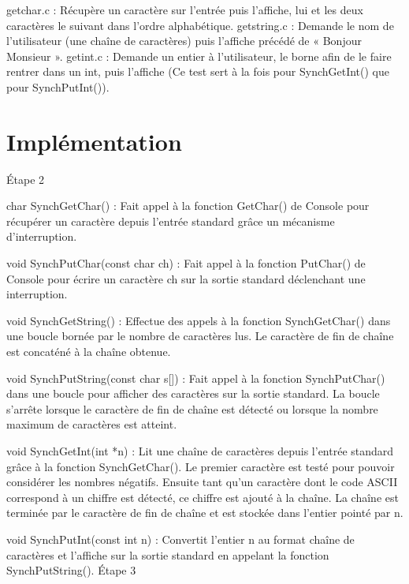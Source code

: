 \documentclass[12pt]{report}
\begin{document}
getchar.c : Récupère un caractère sur l’entrée puis l’affiche, lui et les deux caractères le suivant dans l’ordre alphabétique.
getstring.c : Demande le nom de l’utilisateur (une chaîne de caractères) puis l’affiche précédé de « Bonjour Monsieur ».
 getint.c : Demande un entier à l’utilisateur, le borne afin de le faire rentrer dans un int, puis l’affiche (Ce test sert à la fois pour SynchGetInt() que pour SynchPutInt()).

\chapter{Implémentation}

\'Etape 2

char SynchGetChar() :
Fait appel à la fonction GetChar() de Console pour récupérer un caractère depuis l'entrée standard grâce un mécanisme d'interruption.

void SynchPutChar(const char ch) : 
Fait appel à la fonction PutChar() de Console pour écrire un caractère ch sur la sortie standard déclenchant une interruption.

void SynchGetString() : 
Effectue des appels à la fonction SynchGetChar() dans une boucle bornée par le nombre de caractères lus. Le caractère de fin de chaîne est concaténé à la chaîne obtenue.

void SynchPutString(const char s[]) : 
Fait appel à la fonction SynchPutChar() dans une boucle pour afficher des caractères sur la sortie standard. La boucle s'arrête lorsque le caractère de fin de chaîne est détecté ou lorsque la nombre maximum de caractères est atteint.  

void SynchGetInt(int *n) : 
Lit une chaîne de caractères depuis l'entrée standard grâce à la fonction SynchGetChar(). Le premier caractère est testé pour pouvoir considérer les nombres négatifs. Ensuite tant qu'un caractère dont le code ASCII correspond à un chiffre est détecté, ce chiffre est ajouté à la chaîne. La chaîne est terminée par le caractère de fin de chaîne et est stockée dans l’entier pointé par n.

void SynchPutInt(const int n) : 
Convertit l'entier n au format chaîne de caractères et l'affiche sur la sortie standard en appelant la fonction SynchPutString().
Étape 3
\end{document}
